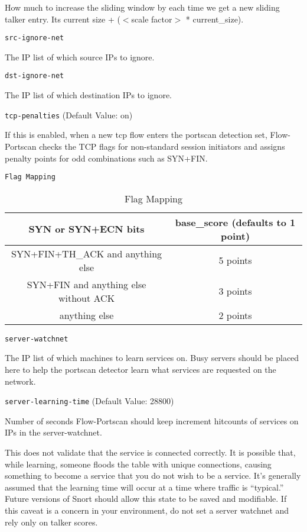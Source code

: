 \documentclass[english]{report}
\newcounter{slistnum}
\newenvironment{slist}
{ \begin{list}{ {\bf \arabic{slistnum}.} }{\usecounter{slistnum} } }
{ \end{list} }
\begin{document}
\begin{slist}
How much to increase the sliding window by each time we get a new sliding
talker entry.  Its current size + ($<$scale factor$>$ * current\_size).  

\item \texttt{src-ignore-net}

The IP list of which source IPs to ignore.

\item \texttt{dst-ignore-net}  

The IP list of which destination IPs to ignore.

\item \texttt{tcp-penalties} (Default Value: on)

If this is enabled, when a new tcp flow enters the portscan detection set,
Flow-Portscan checks the TCP flags for non-standard session initiators and assigns penalty
points for odd combinations such as SYN+FIN. 

\item \texttt{Flag Mapping}

\begin{table}[!hbpt]
\caption{Flag Mapping}
\begin{center}\begin{tabular}{|c|c|}
\hline 
SYN or SYN+ECN bits &
base\_score (defaults to 1 point) \\
\hline 
SYN+FIN+TH\_ACK and anything else & 5 points \\
\hline 
SYN+FIN and anything else without ACK & 3 points \\
\hline 
anything else & 2 points \\
\hline
\end{tabular}\end{center}
\end{table}


\item \texttt{server-watchnet} 

The IP list of which machines to learn services on.  Busy servers should be
placed here to help the portscan detector learn what services are requested on
the network.

\item \texttt{server-learning-time} (Default Value: 28800)

Number of seconds Flow-Portscan should keep increment hitcounts of services on IPs in the
server-watchnet.  

This does not validate that the service is connected correctly. It is
possible that, while learning, someone floods the table with unique connections,
causing something to become a service that you do not wish to be a service.
It's generally assumed that the learning time will occur at a time where
traffic is ``typical.'' Future versions of Snort should allow this state to be
saved and modifiable.  If this caveat is a concern in your environment, do not
set a server watchnet and rely only on talker scores.


\end{slist}
\end{document}
